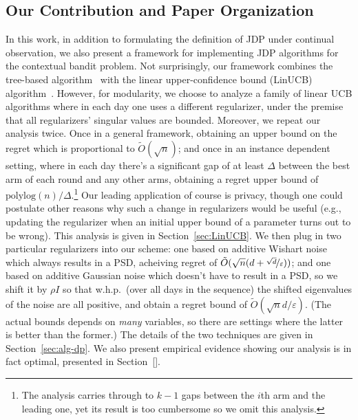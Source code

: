 \documentclass{article}
\begin{document}
\subsection{Our Contribution and Paper Organization}
\label{subsec:contributions}

In this work, in addition to formulating the definition of JDP under
continual observation, we also present a framework for implementing
JDP algorithms for the contextual bandit problem. Not surprisingly,
our framework combines the tree-based algorithm~\cite{DworkContinualObservation2010}  with the linear
upper-confidence bound (LinUCB) algorithm~\cite{???????}.  However, for modularity,
we choose to analyze a family of linear UCB algorithms where in each
day one uses a different regularizer, under the premise that all
regularizers' singular values are bounded. Moreover, we repeat our analysis twice. Once in a general framework,
obtaining an upper bound on the regret which is proportional to
$\tilde O(\sqrt n)$; and once in an instance dependent setting, where in each
day there's a significant gap of at least $\Delta$ between the best arm of each round and any other
arms, obtaining a regret upper bound of $\mathrm{polylog}(n)/\Delta$.\footnote{The analysis carries through to $k-1$ gaps between the $i$th
arm and the leading one, yet its result is too cumbersome so we omit
this analysis.} Our leading application of course is privacy, though
one could postulate other reasons why such a change in regularizers
would be useful (e.g., updating the regularizer when an initial upper
bound of a parameter turns out to be wrong). This analysis is given in Section~\ref{sec:LinUCB}. We then plug in two
particular regularizers into our scheme: one based on additive Wishart
noise \citep{SheffetPrivateApproxRegression2015} which always results
in a PSD, acheiving regret of $\tilde O(\sqrt{n}(d+\nicefrac{\sqrt d}{\varepsilon}))$; and one based on additive Gaussian
noise \citep{DworkAnalyzeGauss2014} which doesn't have to result in a PSD, so
we shift it by $\rho I$ so that w.h.p.\ (over all days in the sequence)
the shifted eigenvalues of the noise are all positive, and obtain a regret bound of $\tilde O(\sqrt n d/\varepsilon)$. (The actual bounds depends on \emph{many} variables, so there are settings where the latter is better than the former.) The details of the two techniques are given in Section~\ref{sec:alg-dp}.  We also present
empirical evidence showing our analysis is in fact optimal, presented in Section~\ref{}.
\end{document}
